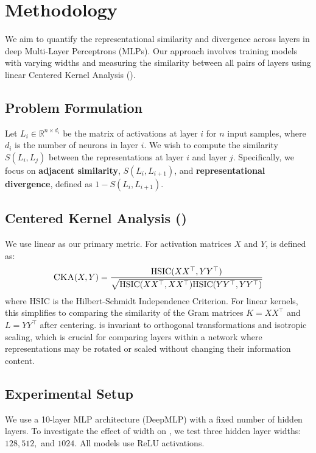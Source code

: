 \section{Methodology}
\label{sec:method}

We aim to quantify the representational similarity and divergence across layers in deep Multi-Layer Perceptrons (MLPs). Our approach involves training models with varying widths and measuring the similarity between all pairs of layers using linear Centered Kernel Analysis (\cka).

\subsection{Problem Formulation}
Let $L_i \in \mathbb{R}^{n \times d_i}$ be the matrix of activations at layer $i$ for $n$ input samples, where $d_i$ is the number of neurons in layer $i$. We wish to compute the similarity $S(L_i, L_j)$ between the representations at layer $i$ and layer $j$. Specifically, we focus on {\bf adjacent similarity}, $S(L_i, L_{i+1})$, and {\bf representational divergence}, defined as $1 - S(L_i, L_{i+1})$.

\subsection{Centered Kernel Analysis (\cka)}
We use linear \cka \cite{kornblith2019similarity} as our primary metric. For activation matrices $X$ and $Y$, \cka is defined as:
\begin{equation}
    \text{\textsc{CKA}}(X, Y) = \frac{\text{HSIC}(XX^\top, YY^\top)}{\sqrt{\text{HSIC}(XX^\top, XX^\top) \text{HSIC}(YY^\top, YY^\top)}}
\end{equation}
where HSIC is the Hilbert-Schmidt Independence Criterion. For linear kernels, this simplifies to comparing the similarity of the Gram matrices $K = XX^\top$ and $L = YY^\top$ after centering. \cka is invariant to orthogonal transformations and isotropic scaling, which is crucial for comparing layers within a network where representations may be rotated or scaled without changing their information content.

\subsection{Experimental Setup}
We use a 10-layer MLP architecture (DeepMLP) with a fixed number of hidden layers. To investigate the effect of width on \transcap, we test three hidden layer widths: $128, 512,$ and $1024$. All models use ReLU activations.

